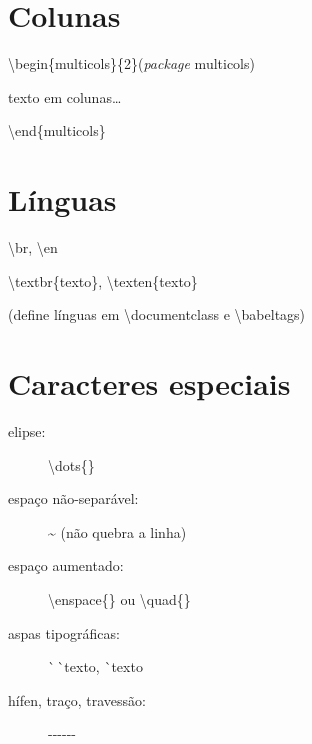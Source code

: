 \documentclass[11pt,twoside,english,brazilian]{article}
\begin{document}
\begin{multicols}{3}
\section*{Colunas}

\textbackslash{}begin\{multicols\}\{2\}\quad (\textit{package} \textsf{multicols})

\quad texto em colunas\dots

\textbackslash{}end\{multicols\}

\columnbreak

\section*{Línguas}

\textbackslash{}br, \textbackslash{}en

\textbackslash{}textbr\{texto\}, \textbackslash{}texten\{texto\}

(define línguas em \textsf{\textbackslash{}documentclass} e \textsf{\textbackslash{}babeltags})

\section*{Caracteres especiais}

\begin{description}
  \item[elipse:] \textbackslash{}dots\{\}
  \item[espaço não-separável:] \textasciitilde{} (não quebra a linha)
  \item[espaço aumentado:] \textbackslash{}enspace\{\} ou \textbackslash{}quad\{\}
  \item[aspas tipográficas:] \strut\`\space\,\`\space\;\!texto\;\!\textquotesingle\:\textquotesingle,
                \`\space\;\!texto\;\!\textquotesingle
  \item[hífen, traço, travessão:] -\quad -\hspace{.7pt}-\quad -\hspace{.7pt}-\hspace{.7pt}-
\end{description}

\vspace{\baselineskip}


\end{multicols}
\end{document}
